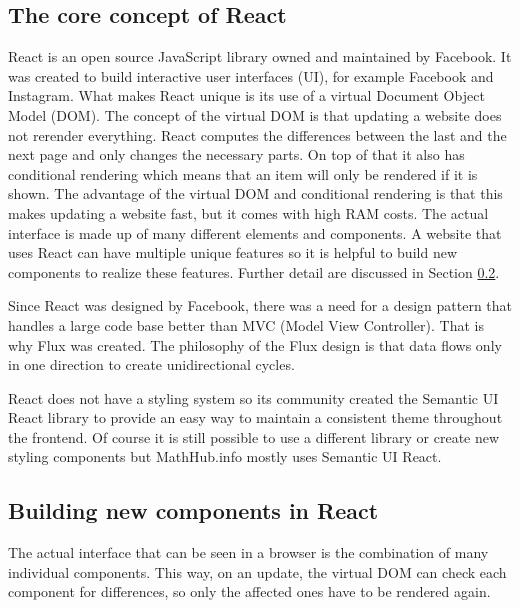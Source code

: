 \documentclass[11pt,a4paper]{article}
\begin{document}
\subsection{The core concept of React} \label{react}
React is an open source JavaScript library owned and maintained by Facebook.
It was created to build interactive user interfaces (UI), for example Facebook and Instagram.
What makes React unique is its use of a virtual Document Object Model (DOM).
The concept of the virtual DOM is that updating a website does not rerender everything.
React computes the differences between the last and the next page and only changes the necessary parts.
On top of that it also has conditional rendering which means that an item will only be rendered if it is shown.
The advantage of the virtual DOM and conditional rendering is that this makes updating a website fast, but it comes with high RAM costs.
The actual interface is made up of many different elements and components.
A website that uses React can have multiple unique features so it is helpful to build new components to realize these features\cite{reactjs}.
Further detail are discussed in Section \ref{components}.

Since React was designed by Facebook, there was a need for a design pattern that handles a large code base better than MVC (Model View Controller).
That is why Flux was created.
The philosophy of the Flux design is that data flows only in one direction to create unidirectional cycles. \cite{flux}

React does not have a styling system so its community created the Semantic UI React library to provide an easy way to maintain a consistent theme throughout the frontend.
Of course it is still possible to use a different library or create new styling components but MathHub.info mostly uses Semantic UI React.

\subsection{Building new components in React} \label{components}
The actual interface that can be seen in a browser is the combination of many individual components.
This way, on an update, the virtual DOM can check each component for differences, so only the affected ones have to be rendered again.
\end{document}
